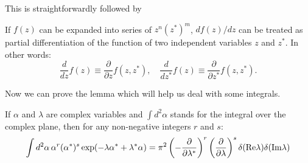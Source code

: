 This is straightforwardly followed by
\begin{lemma}
If $f(z)$ can be expanded into series of $z^n (z^*)^m$, $df(z)/dz$ can be treated as partial differentiation of the function of two independent variables $z$ and $z^*$.
In other words:
\[
	\frac{d}{dz} f(z) \equiv \frac{\partial}{\partial z} f(z, z^*),
	\quad
	\frac{d}{dz^*} f(z) \equiv \frac{\partial}{\partial z^*} f(z, z^*).
\]
\end{lemma}

Now we can prove the lemma which will help us deal with some integrals.
\begin{lemma}
\label{lmm:multimode-formalism:fourier-of-moments}
If $\alpha$ and $\lambda$ are complex variables and $\int d^2\alpha$ stands for the integral over the complex plane, then for any non-negative integers $r$ and $s$:
\[
	\int d^2\alpha\, \alpha^r (\alpha^*)^s \exp(-\lambda \alpha^* + \lambda^* \alpha)
	= \pi^2
		\left( -\frac{\partial}{\partial \lambda^*} \right)^r
		\left( \frac{\partial}{\partial \lambda} \right)^s
		\delta(\mathrm{Re} \lambda) \delta(\mathrm{Im} \lambda)
\]
\end{lemma}
